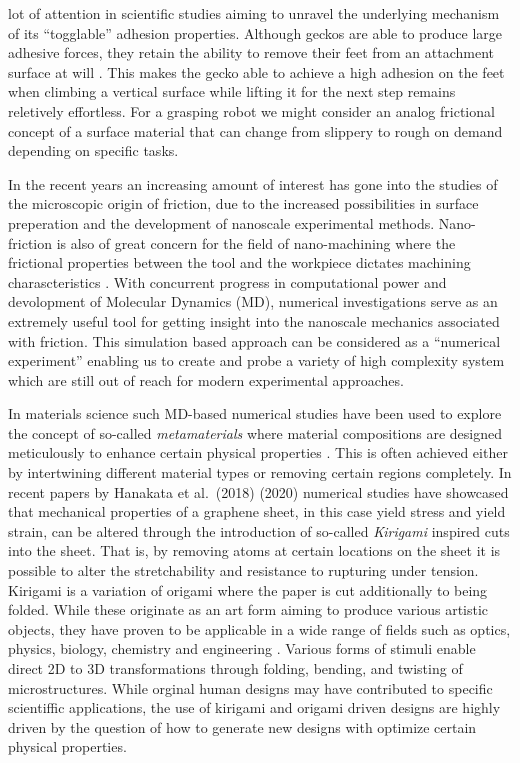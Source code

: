 lot of attention in scientific studies aiming to unravel the underlying
mechanism of its ``togglable'' adhesion properties. Although geckos are able to
produce large adhesive forces, they retain the ability to remove their feet from
an attachment surface at will \cite{Gekko}. This makes the gecko able to achieve
a high adhesion on the feet when climbing a vertical surface while lifting it
for the next step remains reletively effortless. For a grasping robot we might
consider an analog frictional concept of a surface material that can change from
slippery to rough on demand depending on specific tasks.

In the recent years an increasing amount of interest has gone into the studies
of the microscopic origin of friction, due to the increased possibilities in
surface preperation and the development of nanoscale experimental methods.
Nano-friction is also of great concern for the field of nano-machining where the
frictional properties between the tool and the workpiece dictates machining
charascteristics \cite{kim_nano-scale_2009}. With concurrent progress in
computational power and devolopment of Molecular Dynamics (\acrshort{MD}),
numerical investigations serve as an extremely useful tool for getting
insight into the nanoscale mechanics associated with friction. This simulation
based approach can be considered as a ``numerical experiment'' enabling us to create and
probe a variety of high complexity system which are still out of reach for modern experimental approaches.

In materials science such \acrshort{MD}-based numerical studies have been used to explore the concept of so-called \textit{metamaterials} where material compositions are
designed meticulously to enhance certain physical properties
\cite{PhysRevLett.121.255304}\cite{PhysRevResearch.2.042006}\cite{graphene/hBN}\cite{Mao}\cite{Yang}\cite{Forte}.
This is often achieved either by intertwining different material types or
removing certain regions completely. In recent papers by Hanakata et al.\
\cite{PhysRevLett.121.255304}(2018) \cite{PhysRevResearch.2.042006}(2020)
numerical studies have showcased that mechanical properties of a graphene
sheet, in this case yield stress and yield strain, can be altered through the
introduction of so-called \textit{Kirigami} inspired cuts into the sheet. That
is, by removing atoms at certain locations on the sheet it is possible to alter
the stretchability and resistance to rupturing under tension. Kirigami is a
variation of origami where the paper is cut additionally to being folded. While
these originate as an art form aiming to produce various artistic objects, they
have proven to be applicable in a wide range of fields such as optics, physics,
biology, chemistry and engineering \cite{chen_kirigamiorigami_2020}. Various
forms of stimuli enable direct 2D to 3D transformations through folding,
bending, and twisting of microstructures. While orginal human designs may have contributed to specific scientiffic applications, the use of kirigami and
origami driven designs are highly driven by the question of how to generate new designs with optimize certain physical properties.


